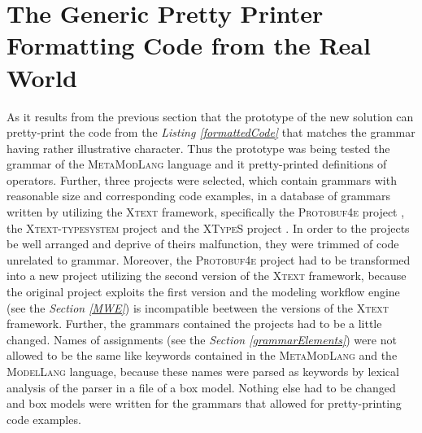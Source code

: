 \documentclass[12pt,notitlepage,a4paper]{report}
\begin{document}
\section {The Generic Pretty Printer Formatting  Code from the Real World}
As it results from the previous section that the prototype of the new solution can pretty-print the code from the \textit{Listing \ref{formattedCode}} that matches the grammar having rather illustrative character. Thus  the prototype was being tested the grammar of the \textsc{MetaModLang} language and it pretty-printed definitions of operators.  Further, three projects were selected, which contain grammars with reasonable size and corresponding  code examples, in a database \cite{XtextCommunity} of grammars written by utilizing the \textsc{Xtext} framework, specifically the \textsc{Protobuf4e} project \cite{Protobuf}, the \textsc{Xtext-typesystem} project \cite{Xtexttypesystem} and the \textsc{XTypeS} project \cite{XTypeS}. In order to the projects be well arranged and deprive of theirs malfunction, they were trimmed of code unrelated to grammar. Moreover, the \textsc{Protobuf4e} project had to be transformed into a new project utilizing the second version of the \textsc{Xtext} framework, because the original project exploits the first version and the modeling workflow engine (see the \textit{Section \ref{MWE}}) is incompatible beetween the versions of the \textsc{Xtext} framework. Further, the grammars contained the projects had to be a little changed. Names of assignments (see the \textit{Section \ref{grammarElements}}) were not allowed to be the same like keywords contained in the \textsc{MetaModLang} and the \textsc{ModelLang} language, because these names were parsed as keywords by lexical analysis of the parser in a file of a box model. Nothing else had to be changed and box models were written for the grammars that allowed for pretty-printing code examples.
\end{document}
